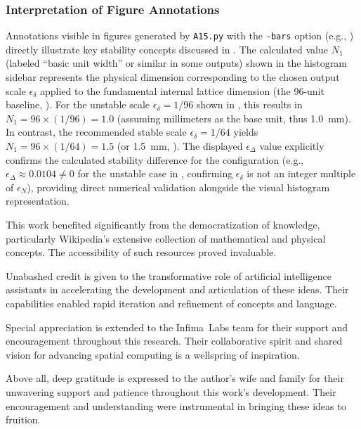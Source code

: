 \documentclass[10pt]{article}
\def\IL{Infima~Labs}
\begin{document}
\subsubsection{Interpretation of Figure Annotations}\label{subsubsec-notes-figures}
Annotations visible in figures generated by \texttt{A15.py} with the \texttt{-bars} option (e.g., ) directly illustrate key stability concepts discussed in . The calculated value $N_1$ (labeled ``basic unit width'' or similar in some outputs) shown in the histogram sidebar represents the physical dimension corresponding to the chosen output scale $\epsilon_\delta$ applied to the fundamental internal lattice dimension (the 96-unit baseline, ). For the unstable scale $\epsilon_\delta=1/96$ shown in , this results in $N_1 = 96 \times (1/96) = 1.0$ (assuming millimeters as the base unit, thus \SI{1.0}{\milli\meter}). In contrast, the recommended stable scale $\epsilon_\delta = 1/64$ yields $N_1 = 96 \times (1/64) = 1.5$ (or \SI{1.5}{\milli\meter}, ). The displayed $\epsilon_\Delta$ value explicitly confirms the calculated stability difference for the configuration (e.g., $\epsilon_\Delta \approx \num{0.0104} \neq 0$ for the unstable case in , confirming $\epsilon_\delta$ is not an integer multiple of $\epsilon_N$), providing direct numerical validation alongside the visual histogram representation.


\begin{acknowledgements}
    This work benefited significantly from the democratization of knowledge, particularly Wikipedia's extensive collection of mathematical and physical concepts. The accessibility of such resources proved invaluable.

    Unabashed credit is given to the transformative role of artificial intelligence assistants in accelerating the development and articulation of these ideas. Their capabilities enabled rapid iteration and refinement of concepts and language.

    Special appreciation is extended to the \IL{} team for their support and encouragement throughout this research. Their collaborative spirit and shared vision for advancing spatial computing is a wellspring of inspiration.

    Above all, deep gratitude is expressed to the author's wife and family for their unwavering support and patience throughout this work's development. Their encouragement and understanding were instrumental in bringing these ideas to fruition.
\end{acknowledgements}




\end{document}
